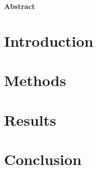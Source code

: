 \documentclass[dutch, a4paper, 11pt]{article}
\begin{document}



\begin{tcolorbox}[colframe=ugent_blue, colback=ugent_blue!10, enhanced jigsaw, boxrule=0.5pt]
{\bf Abstract}\\
\lipsum[1- 2]
\end{tcolorbox}



\begin{multicols}{2}  %

    \section{Introduction}

        
        
        
        
        

    \section{Methods}

    \section{Results}

    \section{Conclusion}

\end{multicols}
\end{document}
